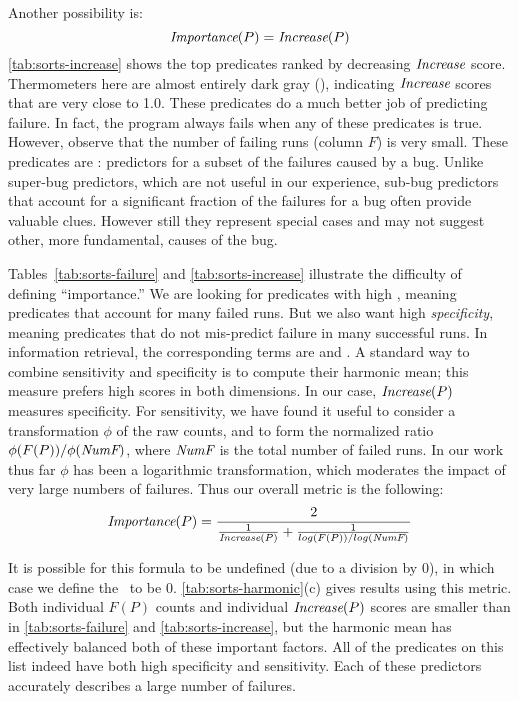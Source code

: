 Another possibility is:
\[ \textit{Importance}(P) = \textit{Increase}(P) \]
\autoref{tab:sorts-increase} shows the top predicates ranked by
decreasing $\textit{Increase}$ score.  Thermometers here are almost entirely
dark gray (), indicating $\textit{Increase}$ scores that are very
close to 1.0.  These predicates do a much better job of predicting
failure.  In fact, the program always fails when any of these
predicates is true.  However, observe that the number of failing runs
(column $F$) is very small.  These predicates are : predictors for a subset of the failures caused by a
bug.  Unlike super-bug predictors, which are not useful in our
experience, sub-bug predictors that account for a significant fraction
of the failures for a bug often provide valuable clues.  However still
they represent special cases and may not suggest other, more
fundamental, causes of the bug.

Tables~\ref{tab:sorts-failure} and \ref{tab:sorts-increase} illustrate
the difficulty of defining ``importance.''  We are looking for
predicates with high , meaning predicates that
account for many failed runs.  But we also want high
\emph{specificity}, meaning predicates that do not mis-predict failure
in many successful runs.  In information retrieval, the corresponding
terms are  and .  A standard way to combine sensitivity
and specificity is to compute their harmonic mean; this measure
prefers high scores in both dimensions.  In our case, $\textit{Increase}(P)$
measures specificity.  For sensitivity, we have found it useful to
consider a transformation $\phi$ of the raw counts, and to form the
normalized ratio $\phi(F(P)) / \phi(\textit{NumF})$, where $\textit{NumF}$ is
the total number of failed runs.  In our work thus far $\phi$ has been
a logarithmic transformation, which moderates the impact of very large
numbers of failures.  Thus our overall metric is the following:
\[
\textit{Importance}(P) =
\frac{2}{
  \frac{1}{\textit{Increase}(P)}
  +
  \frac{1}{log(F(P)) / log(\textit{NumF})}}
\]

It is possible for this formula to be undefined (due to a division by 0),
in which case we define the \importance\ to be 0.
\autoref{tab:sorts-harmonic}(c) gives results using this metric.
Both individual $F(P)$ counts and individual $\textit{Increase}(P)$ scores are smaller than in
\autoref{tab:sorts-failure} and \autoref{tab:sorts-increase}, but the harmonic mean
has effectively balanced both of these important factors.  All of the
predicates on this list indeed have both high specificity and
sensitivity.  Each of these predictors accurately describes a large
number of failures.


